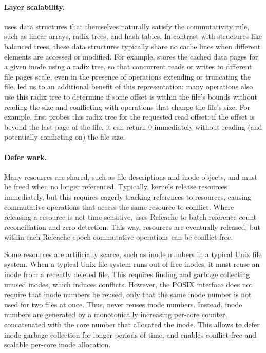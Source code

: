 \paragraph{Layer scalability.}  \fs uses data structures that
themselves naturally satisfy the commutativity rule, such as linear
arrays, radix trees, and hash tables.  In
contrast with structures like balanced trees, these data
structures
typically share no cache lines when different elements are accessed
or modified.  For example, \fs stores the cached data pages for a given inode
using a radix tree, so that concurrent reads or writes to different
file pages scale, even in the presence of operations
extending or truncating the file.
\tool led us to an additional benefit of this representation:
many operations also use this radix tree to determine if some offset
is within the file's bounds without reading the size and conflicting
with operations
that change the file's size.
%
For example,  first probes this radix tree for the
requested read offset: if the offset is beyond the last page of the
file, it can return 0 immediately without reading (and potentially
conflicting on) the file size.


\paragraph{Defer work.} Many \fs resources are shared,
such as file descriptions and inode objects, and must be freed when no
longer referenced.
Typically, kernels release resources immediately, but this requires
eagerly tracking references to resources, causing
commutative operations that access the same resource to conflict.  Where
releasing a resource is not time-sensitive, \fs
uses Refcache to batch reference count
reconciliation and zero detection.  This way, resources are eventually
released, but within each Refcache epoch commutative operations can be
conflict-free.


Some resources are artificially scarce, such as inode numbers in a typical
Unix file system.  When a typical Unix file system runs out of free
inodes, it must reuse an inode from a recently deleted file.
%
This requires finding and garbage collecting unused inodes, which
induces conflicts.
%
However,
the POSIX interface does not require that inode numbers be reused, only
that the same inode number is not used for two files at once.  Thus,
\fs never reuses inode numbers.  Instead, inode numbers are
generated by a monotonically increasing per-core counter, concatenated
with the core number that allocated the inode.  This allows \fs to defer
inode garbage collection for longer periods of time, and enables
conflict-free and scalable
per-core inode allocation.


